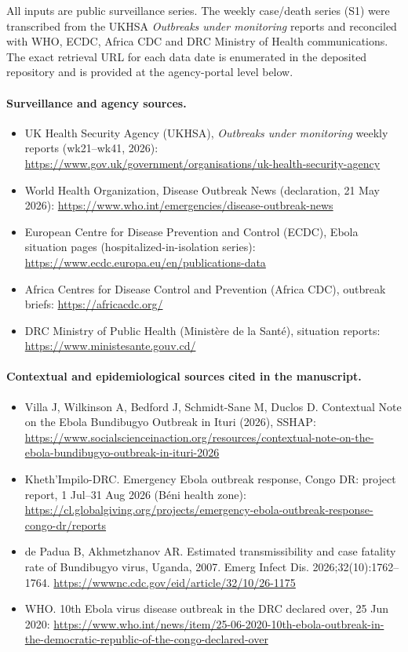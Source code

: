 \documentclass[11pt]{article}
\begin{document}
All inputs are public surveillance series. The weekly case/death series
(S1) were transcribed from the UKHSA \emph{Outbreaks under monitoring}
reports and reconciled with WHO, ECDC, Africa CDC and DRC Ministry of
Health communications. The exact retrieval URL for each data date is
enumerated in the deposited repository and is provided at the
agency-portal level below.

\paragraph*{Surveillance and agency sources.}
\begin{itemize}
  \item UK Health Security Agency (UKHSA), \emph{Outbreaks under monitoring} weekly reports (wk21--wk41, 2026): \url{https://www.gov.uk/government/organisations/uk-health-security-agency}
  \item World Health Organization, Disease Outbreak News (declaration, 21 May 2026): \url{https://www.who.int/emergencies/disease-outbreak-news}
  \item European Centre for Disease Prevention and Control (ECDC), Ebola situation pages (hospitalized-in-isolation series): \url{https://www.ecdc.europa.eu/en/publications-data}
  \item Africa Centres for Disease Control and Prevention (Africa CDC), outbreak briefs: \url{https://africacdc.org/}
  \item DRC Ministry of Public Health (Minist\`ere de la Sant\'e), situation reports: \url{https://www.ministesante.gouv.cd/}
\end{itemize}

\paragraph*{Contextual and epidemiological sources cited in the manuscript.}
\begin{itemize}
  \item Villa J, Wilkinson A, Bedford J, Schmidt-Sane M, Duclos D. Contextual Note on the Ebola Bundibugyo Outbreak in Ituri (2026), SSHAP: \url{https://www.socialscienceinaction.org/resources/contextual-note-on-the-ebola-bundibugyo-outbreak-in-ituri-2026}
  \item Kheth'Impilo-DRC. Emergency Ebola outbreak response, Congo DR: project report, 1 Jul--31 Aug 2026 (B\'eni health zone): \url{https://cl.globalgiving.org/projects/emergency-ebola-outbreak-response-congo-dr/reports}
  \item de Padua B, Akhmetzhanov AR. Estimated transmissibility and case fatality rate of Bundibugyo virus, Uganda, 2007. Emerg Infect Dis. 2026;32(10):1762--1764. \url{https://wwwnc.cdc.gov/eid/article/32/10/26-1175}
  \item WHO. 10th Ebola virus disease outbreak in the DRC declared over, 25 Jun 2020: \url{https://www.who.int/news/item/25-06-2020-10th-ebola-outbreak-in-the-democratic-republic-of-the-congo-declared-over}
\end{itemize}
\end{document}
